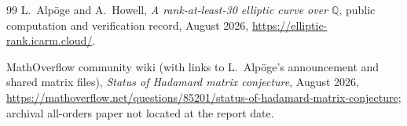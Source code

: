 \documentclass[11pt,oneside]{article}
\theoremstyle{definition}
\theoremstyle{remark}
\newcommand{\Q}{\mathbb Q}
\begin{document}
\begin{thebibliography}{99}
L.~Alp\"oge and A.~Howell,
\newblock \emph{A rank-at-least-30 elliptic curve over $\Q$},
\newblock public computation and verification record, August 2026,
\newblock \url{https://elliptic-rank.icarm.cloud/}.

MathOverflow community wiki (with links to L.~Alp\"oge's announcement and shared matrix
files),
\newblock \emph{Status of Hadamard matrix conjecture}, August 2026,
\newblock \url{https://mathoverflow.net/questions/85201/status-of-hadamard-matrix-conjecture};
archival all-orders paper not located at the report date.

\end{thebibliography}
\end{document}
